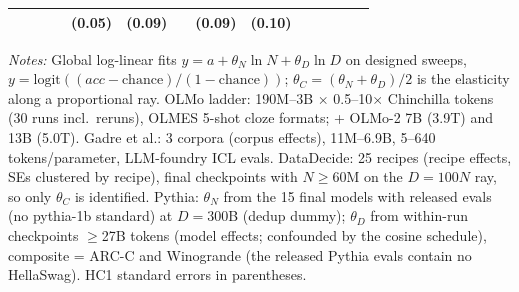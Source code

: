 \begin{table}[!htbp]
\begin{threeparttable}
\begin{tabular}{lccccccccccccc}
 &  &  &  & (0.05) & (0.09) &  & (0.09) & (0.10) &  &  &  &  &  \\
\bottomrule
\end{tabular}
\begin{tablenotes}[flushleft]
\footnotesize
\item \textit{Notes:} Global log-linear fits $y=a+\theta_N\ln N+\theta_D\ln D$ on designed sweeps, $y=\text{logit}((acc-\text{chance})/(1-\text{chance}))$; $\theta_C=(\theta_N+\theta_D)/2$ is the elasticity along a proportional ray. OLMo ladder: 190M--3B $\times$ 0.5--10$\times$ Chinchilla tokens (30 runs incl.\ reruns), OLMES 5-shot cloze formats; + OLMo-2 7B (3.9T) and 13B (5.0T). Gadre et al.: 3 corpora (corpus effects), 11M--6.9B, 5--640 tokens/parameter, LLM-foundry ICL evals. DataDecide: 25 recipes (recipe effects, SEs clustered by recipe), final checkpoints with $N\geq$60M on the $D=100N$ ray, so only $\theta_C$ is identified. Pythia: $\theta_N$ from the 15 final models with released evals (no pythia-1b standard) at $D=300$B (dedup dummy); $\theta_D$ from within-run checkpoints $\geq$27B tokens (model effects; confounded by the cosine schedule), composite = ARC-C and Winogrande (the released Pythia evals contain no HellaSwag). HC1 standard errors in parentheses.
\end{tablenotes}
\end{threeparttable}
\end{table}
